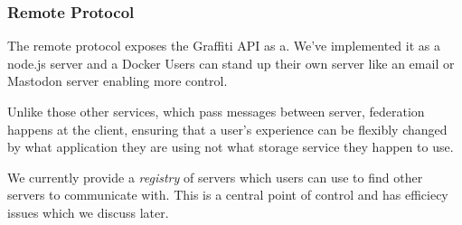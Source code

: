 





\subsubsection{Remote Protocol}
\label{above-and-below:remote-protocol}

The remote protocol exposes the Graffiti API as a.
We've implemented it as a node.js server and a Docker
Users can stand up their own server like an email or Mastodon
server enabling more control.

Unlike those other services, which pass messages between
server, federation happens at the client, ensuring that
a user's experience can be flexibly changed by what
application they are using not what storage service they happen to use.

We currently provide a \emph{registry} of servers which
users can use to find other servers to communicate with.
This is a central point of control and has efficiecy issues which we discuss later.



